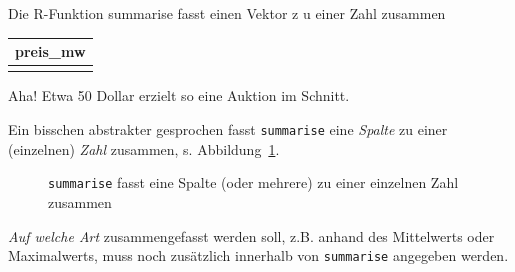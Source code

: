 \documentclass[
  letterpaper,
  twoside,
  open=any]{scrbook}
\newenvironment{Shaded}{\begin{snugshade}}{\end{snugshade}}
\newcommand{\AttributeTok}[1]{\textcolor[rgb]{0.40,0.45,0.13}{#1}}
\newcommand{\FunctionTok}[1]{\textcolor[rgb]{0.28,0.35,0.67}{#1}}
\newcommand{\NormalTok}[1]{\textcolor[rgb]{0.00,0.23,0.31}{#1}}
\newcommand{\OtherTok}[1]{\textcolor[rgb]{0.00,0.23,0.31}{#1}}
\theoremstyle{definition}
\theoremstyle{definition}
\theoremstyle{definition}
\theoremstyle{remark}
\begin{document}
\begin{codelisting}

\caption{\label{lst-summarise}Die R-Funktion summarise fasst einen
Vektor z u einer Zahl zusammen}

\centering{

\begin{Shaded}
\begin{Highlighting}[]
\NormalTok{mariokart\_mittelwert }\OtherTok{\textless{}{-}} \FunctionTok{summarise}\NormalTok{(mariokart,}
                                  \AttributeTok{preis\_mw =} \FunctionTok{mean}\NormalTok{(total\_pr))}
\NormalTok{mariokart\_mittelwert}
\end{Highlighting}
\end{Shaded}

}

\end{codelisting}%

\begin{longtable}[]{@{}r@{}}
\toprule\noalign{}
preis\_mw \\
\midrule\noalign{}
\endhead
\bottomrule\noalign{}
\endlastfoot
50 \\
\end{longtable}

Aha! Etwa 50 Dollar erzielt so eine Auktion im Schnitt.

Ein bisschen abstrakter gesprochen fasst \texttt{summarise} eine
\emph{Spalte} zu einer (einzelnen) \emph{Zahl} zusammen, s.
Abbildung~\ref{fig-desk-summ}.

\begin{figure}


\caption{\label{fig-desk-summ}\texttt{summarise} fasst eine Spalte (oder
mehrere) zu einer einzelnen Zahl zusammen}

\end{figure}%

\emph{Auf welche Art} zusammengefasst werden soll, z.B. anhand des
Mittelwerts oder Maximalwerts, muss noch zusätzlich innerhalb von
\texttt{summarise} angegeben werden.
\end{document}
